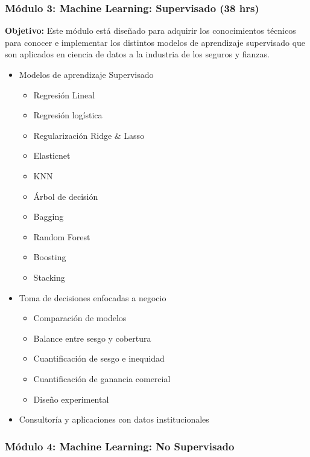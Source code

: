 \documentclass[
]{book}
\providecommand{\tightlist}{%
  \setlength{\itemsep}{0pt}\setlength{\parskip}{0pt}}
\begin{document}
\hypertarget{muxf3dulo-3-machine-learning-supervisado-38-hrs}{%
\subsubsection*{Módulo 3: Machine Learning: Supervisado (38 hrs)}\label{muxf3dulo-3-machine-learning-supervisado-38-hrs}}

\textbf{Objetivo:} Este módulo está diseñado para adquirir los conocimientos técnicos para conocer e implementar los distintos modelos de aprendizaje supervisado que son aplicados en ciencia de datos a la industria de los seguros y fianzas.

\begin{itemize}
\item
  Modelos de aprendizaje Supervisado

  \begin{itemize}
  \tightlist
  \item
    Regresión Lineal
  \item
    Regresión logística
  \item
    Regularización Ridge \& Lasso
  \item
    Elasticnet
  \item
    KNN
  \item
    Árbol de decisión
  \item
    Bagging
  \item
    Random Forest
  \item
    Boosting
  \item
    Stacking
  \end{itemize}
\item
  Toma de decisiones enfocadas a negocio

  \begin{itemize}
  \tightlist
  \item
    Comparación de modelos
  \item
    Balance entre sesgo y cobertura
  \item
    Cuantificación de sesgo e inequidad
  \item
    Cuantificación de ganancia comercial
  \item
    Diseño experimental
  \end{itemize}
\item
  Consultoría y aplicaciones con datos institucionales
\end{itemize}

\hypertarget{muxf3dulo-4-machine-learning-no-supervisado}{%
\subsubsection*{Módulo 4: Machine Learning: No Supervisado}\label{muxf3dulo-4-machine-learning-no-supervisado}}
\end{document}
